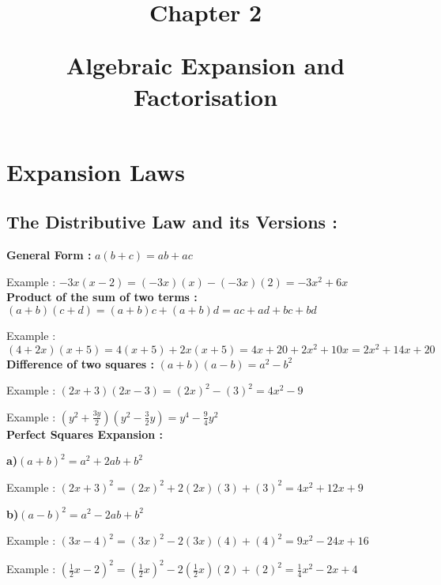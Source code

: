 \documentclass{article}
\title{Chapter 2
	
	Algebraic Expansion and Factorisation}
\author{}
\date{}
\begin{document}
\maketitle
\section{Expansion Laws}
\subsection{The Distributive Law and its Versions :}
\textbf{General Form : }{\boldmath$a(b+c) = ab + ac$}

{\footnotesize Example : $-3x(x-2) = (-3x)(x) - (-3x)(2) = -3x^2 + 6x$}\\
\textbf{Product of the sum of two terms :}{\boldmath$(a+b)(c+d) = (a+b)c + (a+b)d = ac + ad + bc + bd$}

{\footnotesize Example : $(4+2x)(x+5) = 4(x+5) + 2x(x+5) = 4x + 20 + 2x^2 + 10x = 2x^2 + 14x + 20$}\\
\textbf{Difference of two squares :} {\boldmath$(a+b)(a-b) = a^2 - b^2$}

{\footnotesize Example : $(2x+3)(2x-3) = (2x)^2 - (3)^2 = 4x^2 - 9$}

{\footnotesize Example : $(y^2 + \frac{3y}{2})(y^2 -\frac{3}{2}y) = y^4 - \frac{9}{4}y^2$}\\
\textbf{Perfect Squares Expansion :}

\textbf{a)}{\boldmath $(a+b)^2 = a^2 + 2ab + b^2$}

{\footnotesize Example : $(2x+3)^2 =(2x)^2 + 2(2x)(3)+(3)^2	= 4x^2 + 12x + 9$}

\textbf{b)}{\boldmath $(a-b)^2 = a^2 - 2ab + b^2$}

{\footnotesize Example : $(3x-4)^2 = (3x)^2 - 2(3x)(4)+(4)^2 = 9x^2 - 24x + 16$}

{\footnotesize Example : $(\frac{1}{2}x-2)^2 = (\frac{1}{2}x)^2 - 2(\frac{1}{2}x)(2) + (2)^2 = \frac{1}{4}x^2 - 2x + 4$}
\end{document}
